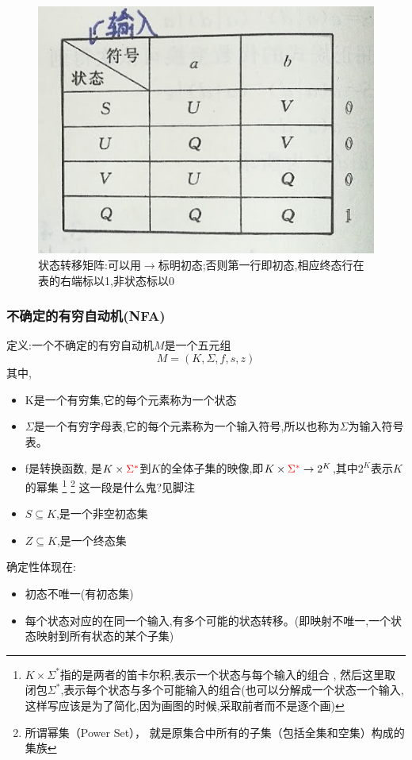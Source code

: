 \begin{figure}[H]
 \centering
 \includegraphics[scale = 0.3]{assets/CompilerConstructionPrinciples_c1ff8.png}
 \caption{状态转移矩阵:可以用$\rightarrow$标明初态;否则第一行即初态,相应终态行在表的右端标以1,非状态标以0}
 \label{fig2}
\end{figure}

\subsubsection{不确定的有穷自动机(NFA)}
定义:一个不确定的有穷自动机$M$是一个五元组
\[M = (K , \Sigma , f , s , z)\]
其中,
\begin{itemize}
 \item [(1)] K是一个有穷集,它的每个元素称为一个状态
 \item [(2)] $\Sigma$是一个有穷字母表,它的每个元素称为一个输入符号,所以也称为$\Sigma$为输入符号表。
 \item [(3)] f是转换函数, 是$K\times {\color{red}\Sigma^*}$到$K$的全体子集的映像,即$K\times {\color{red}\Sigma^*} \to 2^K$,其中$2^K$表示$K$的幂集
       \footnote{$K\times  \Sigma^*$指的是两者的笛卡尔积,表示一个状态与每个输入的组合 ,
        然后这里取闭包$\Sigma^*$,表示每个状态与多个可能输入的组合(也可以分解成一个状态一个输入,这样写应该是为了简化,因为画图的时候,采取前者而不是逐个画)}
       \footnote{所谓幂集（Power Set）， 就是原集合中所有的子集（包括全集和空集）构成的集族}
       {\color{blue}这一段是什么鬼?见脚注}
 \item [(4)] $S\subseteq K$,是一个非空初态集
 \item [(5)] $Z \subseteq  K$,是一个终态集
\end{itemize}
确定性体现在:
\begin{itemize}
 \item 初态不唯一(有初态集)
 \item 每个状态对应的在同一个输入,有多个可能的状态转移。(即映射不唯一,一个状态映射到所有状态的某个子集)
\end{itemize}

